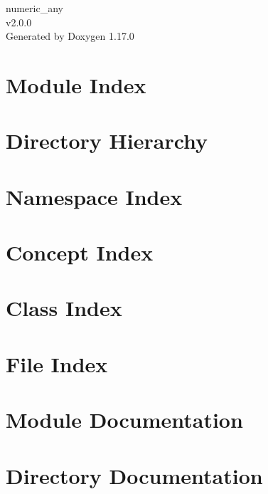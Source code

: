\documentclass[twoside]{book}
\newcommand{\+}{\discretionary{\mbox{\scriptsize$\hookleftarrow$}}{}{}}
\newcommand{\clearemptydoublepage}{%
    \newpage{\pagestyle{empty}\cleardoublepage}%
  }
\begin{document}
  \raggedbottom
    \hypersetup{pageanchor=false,
                bookmarksnumbered=true,
                pdfencoding=unicode
               }
  \begin{titlepage}
  \vspace*{7cm}
  \begin{center}%
  {\Large numeric\+\_\+any}\\
  [1ex]\large v2.\+0.\+0 \\
  \vspace*{1cm}
  {\large Generated by Doxygen 1.17.0}\\
  \end{center}
  \end{titlepage}
  \clearemptydoublepage
  \tableofcontents
  \clearemptydoublepage
  \hypersetup{pageanchor=true}

\chapter{Module Index}

\chapter{Directory Hierarchy}

\chapter{Namespace Index}

\chapter{Concept Index}

\chapter{Class Index}

\chapter{File Index}

\chapter{Module Documentation}


\chapter{Directory Documentation}

\end{document}
